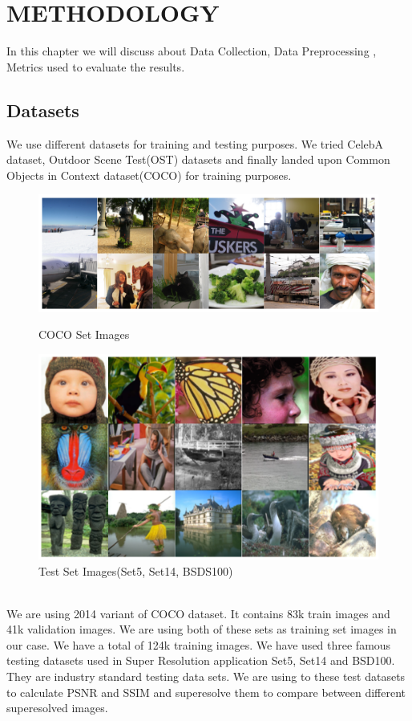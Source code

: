 \newpage
\section{METHODOLOGY}
In this chapter we will discuss about Data Collection, Data Preprocessing , Metrics used to evaluate the results.

    \subsection{Datasets}
        We use different datasets for training and testing purposes. We tried CelebA dataset, Outdoor Scene Test(OST) datasets and finally landed upon  Common Objects in Context dataset(COCO) for training purposes.
        \begin{figure}[ht]
            \centering
            \includegraphics[width=5in]{./figures/train.png}
            \caption{COCO Set Images}
            \includegraphics[width=5.5in]{./figures/test.png}
            \caption{Test Set Images(Set5, Set14, BSDS100)}
        \end{figure}  \\
        We are using 2014 variant of COCO dataset. It contains 83k train images and 41k validation images. We are using both of these sets as training set images in our case. We have a total of 124k training images. We have used three famous testing datasets used in Super Resolution application Set5, Set14 and BSD100. They are industry standard testing data sets. We are using to these test datasets to calculate PSNR and SSIM and superesolve them to compare between different superesolved images.
